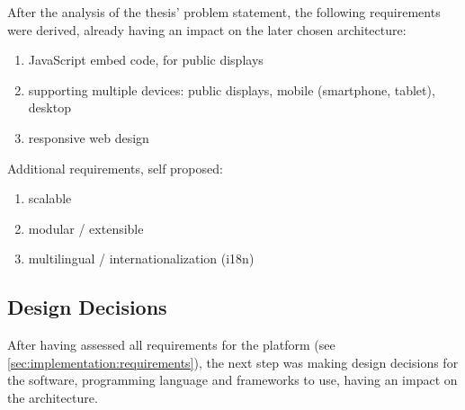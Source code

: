 	After the analysis of the thesis' problem statement, the following requirements were derived, already having an impact on the later chosen architecture:

	\begin{enumerate}[itemsep=0pt] 
	\item JavaScript embed code, for public displays
	\item supporting multiple devices: public displays, mobile (smartphone, tablet), desktop
	\item responsive web design
	\end{enumerate}

	Additional requirements, self proposed:
	\begin{enumerate}[itemsep=0pt] 
	\item scalable
	\item modular / extensible
	\item multilingual / internationalization (i18n)
	\end{enumerate}






\clearpage
% 
\subsection{Design Decisions}
\label{sec:implementation:design-decisions}


	After having assessed all requirements for the platform (see \ref{sec:implementation:requirements}), the next step was making design decisions for the software, programming language and frameworks to use, having an impact on the architecture.



